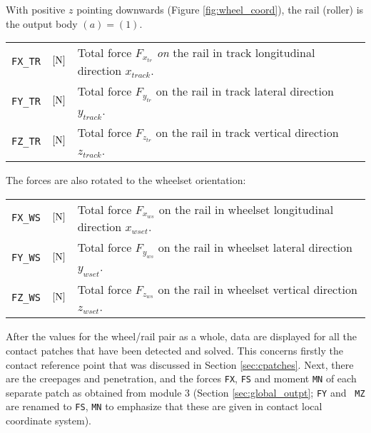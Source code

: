\documentclass[12pt]{report}
\renewcommand{\magenta}[1]{}
\newenvironment{inputvars}{\vspace{0.4\baselineskip}%

\begin{tabular}{>{\raggedright}p{22mm}p{19mm}p{113mm}}}{
\end{tabular}

}
\newcommand{\inpvar}[3]{{\small\tt #1} & $#2$ & #3 \\[1ex]}
\newcommand{\inpbreak}{\end{inputvars}\begin{inputvars}}
\begin{document}
With positive $z$ pointing downwards (Figure \ref{fig:wheel_coord}), the
rail (roller) is the output body $(a)=(1)$.
\begin{inputvars}
\inpvar{FX\_TR}{\bunit{N}}{Total force $F_{x_{tr}}$ {\em on\/} the rail in
        track longitudinal direction $x_{track}$.}
\inpvar{FY\_TR}{\bunit{N}}{Total force $F_{y_{tr}}$ on the rail in track
        lateral direction $y_{track}$.}
\inpvar{FZ\_TR}{\bunit{N}}{Total force $F_{z_{tr}}$ on the rail in track
        vertical direction $z_{track}$.}
\end{inputvars}
The forces are also rotated to the wheelset orientation:
\begin{inputvars}
\inpvar{FX\_WS}{\bunit{N}}{Total force $F_{x_{ws}}$ on the rail in wheelset
        longitudinal direction $x_{wset}$. \magenta{Input when ${\tt
        F}_1=1$.}}
\inpvar{FY\_WS}{\bunit{N}}{Total force $F_{y_{ws}}$ on the rail in wheelset
        lateral direction $y_{wset}$.}
\inpvar{FZ\_WS}{\bunit{N}}{Total force $F_{z_{ws}}$ on the rail in wheelset
        vertical direction $z_{wset}$.}
\end{inputvars}
\magenta{
Rail deflections $\delta y_{\defl}, \delta z_{\defl}$ are output when ${\tt
F}_1=3$:
\begin{inputvars}
\inpvar{DYDEFL}{\bunit{mm}}{Lateral shift $\delta y_{\defl}$ of the rail
        with respect to the input position according to the model of
        Equation (\ref{eq:cntc_defl}).}
\inpvar{DZDEFL}{\bunit{mm}}{Vertical shift $\delta z_{\defl}$ of the rail
        with respect to the input position according to the model of
        Equation (\ref{eq:cntc_defl}).}
\end{inputvars}
}
After the values for the wheel/rail pair as a whole, data are displayed for
all the contact patches that have been detected and solved. This concerns
firstly the contact reference point that was discussed in Section
\ref{sec:cpatches}. Next, there are the creepages and penetration, and the
forces {\tt FX}, {\tt FS} and moment {\tt MN} of each separate patch as
obtained from module 3 (Section \ref{sec:global_outpt}; {\tt FY} and {\tt
MZ} are renamed to {\tt FS}, {\tt MN} to emphasize that these are
given in contact local coordinate system).

\color{black}

\end{document}
